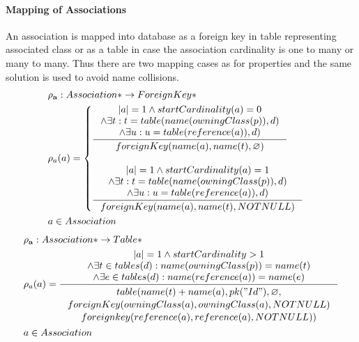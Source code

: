 \documentclass[11pt]{article}
\begin{document}
\paragraph{Mapping of Associations} An association is mapped into database as a foreign key in table representing associated class or as a table in case the association cardinality is one to many or many to many. Thus there are two mapping cases as for properties and the same solution is used to avoid name collisions.
\begin{align*}
&	\mathbf{\rho_a} : Association* \rightarrow ForeignKey* \\
&	\rho_a(a) = \begin{cases}
		\inference{|a| = 1 \wedge  startCardinality(a) = 0 \\ \wedge \exists t : t = table(name(owningClass(p)), d) \\ \wedge \exists u : u = table(reference(a)), d)
		}{
			foreignKey(name(a), name(t),  \varnothing) 
	 	}
  \\ \\
 	 \inference{|a| = 1 \wedge  startCardinality(a) = 1 \\ \wedge \exists t : t = table(name(owningClass(p)), d) \\ \wedge \exists u : u = table(reference(a)), d)
 	 }{ 
		foreignKey(name(a), name(t),  NOTNULL)
	}	 \end{cases}
\\
&	 a \in Association
\end{align*}
\begin{align*} 
&	\mathbf{\rho_a} : Association* \rightarrow Table* \\
&	\rho_a(a) =
		\inference{|a| = 1 \wedge   startCardinality > 1 \\ \wedge \exists t \in tables(d) : name(owningClass(p)) = name(t) \\ \wedge \exists e \in tables(d) : name(reference(a)) = name(e)
  		}{\begin{gathered}  
		 table(name(t)+name(a), pk("Id"), \varnothing, \\ foreignKey(owningClass(a),owningClass(a), NOTNULL) \\ foreignkey(reference(a), reference(a), NOTNULL)) 
  		\end{gathered}}  
\\
&	 a \in Association
\end{align*}
\end{document}
